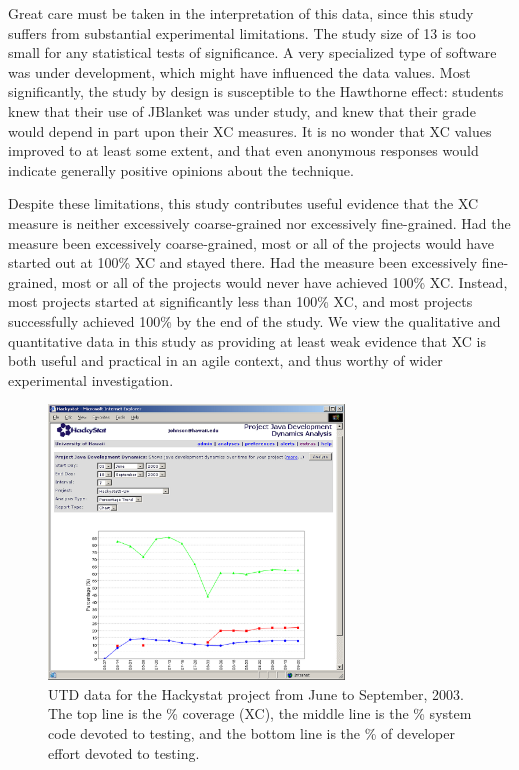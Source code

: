 \documentclass[10pt,twocolumn]{article}
\begin{document}
Great care must be taken in the interpretation of this data, since this
study suffers from substantial experimental limitations. The study size of
13 is too small for any statistical tests of significance.  A very
specialized type of software was under development, which might have
influenced the data values. Most significantly, the study by design is 
susceptible to the Hawthorne effect: students knew that their use of
JBlanket was under study, and knew that their grade would depend in part
upon their XC measures. It is no wonder that XC values improved to at least
some extent, and that even anonymous responses would indicate generally
positive opinions about the technique.

Despite these limitations, this study contributes useful evidence that 
the XC measure is neither excessively coarse-grained nor excessively
fine-grained.  Had the measure been excessively coarse-grained, most or all
of the projects would have started out at 100\% XC and stayed there. Had
the measure been excessively fine-grained, most or all of the projects
would never have achieved 100\% XC.  Instead, most projects started at
significantly less than 100\% XC, and most projects successfully achieved
100\% by the end of the study.  We view the qualitative and quantitative
data in this study as providing at least weak evidence that XC is both
useful and practical in an agile context, and thus worthy of wider
experimental investigation.

\begin{figure}[ht]
  \centering
  \includegraphics[width=0.7\textwidth]{utd3.eps}
  \caption{UTD data for the Hackystat project from June to September,
  2003. The top line is the \% coverage (XC), the middle line is the \%
  system code devoted to testing, and the bottom line is the \% of
  developer effort devoted to testing.}
  \label{fig:UTD}
\end{figure}
\end{document}
